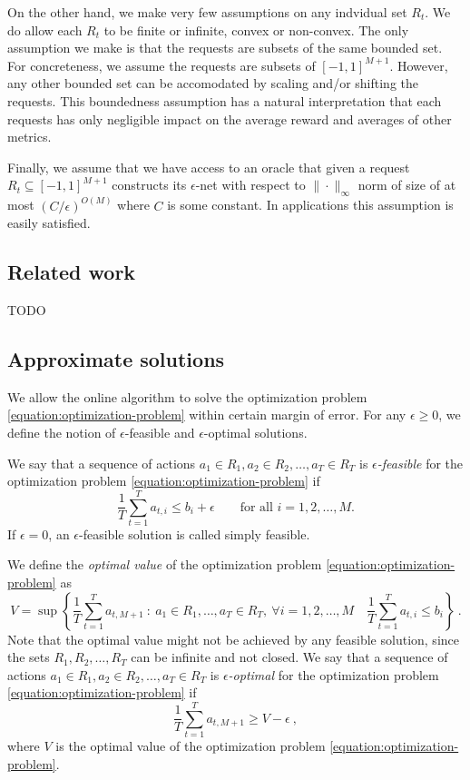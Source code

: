 \documentclass[12pt]{article}
\theoremstyle{definition}
\begin{document}
On the other hand, we make very few assumptions on any indvidual set $R_t$. We
do allow each $R_t$ to be finite or infinite, convex or non-convex. The only
assumption we make is that the requests are subsets of the same bounded set. For
concreteness, we assume the requests are subsets of $[-1,1]^{M+1}$. However, any
other bounded set can be accomodated by scaling and/or shifting the requests.
This boundedness assumption has a natural interpretation that each requests has
only negligible impact on the average reward and averages of other metrics.

Finally, we assume that we have access to an oracle that given a request $R_t
\subseteq [-1, 1]^{M+1}$ constructs its $\epsilon$-net with respect to
$\|\cdot\|_{\infty}$ norm of size of at most $(C/\epsilon)^{O(M)}$ where $C$ is
some constant. In applications this assumption is easily satisfied.

\subsection{Related work}

TODO

\subsection{Approximate solutions}
\label{subsection:approximate-solutions}

We allow the online algorithm to solve the optimization problem
\eqref{equation:optimization-problem} within certain margin of error. For any
$\epsilon \ge 0$, we define the notion of $\epsilon$-feasible and
$\epsilon$-optimal solutions.

We say that a sequence of actions $a_1 \in R_1, a_2 \in R_2, \dots, a_T \in R_T$ is
\emph{$\epsilon$-feasible} for the optimization problem
\eqref{equation:optimization-problem} if
$$
\frac{1}{T} \sum_{t=1}^T a_{t,i} \le b_i + \epsilon \qquad \text{for all $i=1,2,\dots,M$.}
$$
If $\epsilon=0$, an $\epsilon$-feasible solution is called simply feasible.

We define the \emph{optimal value} of the optimization problem
\eqref{equation:optimization-problem} as
$$
V = \sup \left\{\frac{1}{T} \sum_{t=1}^T a_{t,M+1} ~:~ a_1 \in R_1, \dots, a_T \in R_T, \ \forall i=1,2,\dots,M \quad \frac{1}{T} \sum_{t=1}^T a_{t,i} \le b_i  \right\} \: .
$$
Note that the optimal value might not be achieved by any feasible solution,
since the sets $R_1, R_2, \dots, R_T$ can be infinite and not closed. We say
that a sequence of actions $a_1 \in R_1, a_2 \in R_2, \dots, a_T \in R_T$ is
\emph{$\epsilon$-optimal} for the optimization problem
\eqref{equation:optimization-problem} if
$$
\frac{1}{T} \sum_{t=1}^T a_{t,M+1} \ge V - \epsilon \: ,
$$
where $V$ is the optimal value of the optimization problem
\eqref{equation:optimization-problem}.
\end{document}
